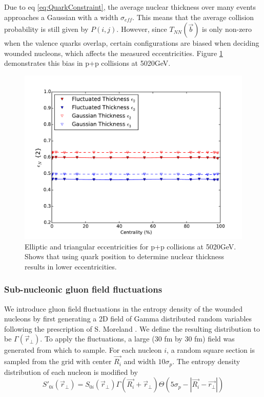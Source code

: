 \documentclass[twocolumn,showpacs,amsfonts,aps,prc,nofootinbib,floatfix]{revtex4}
\begin{document}
Due to eq \ref{eq:QuarkConstraint}, the average nuclear thickness over many events approaches a Gaussian with a width $\sigma_{eff}$. This means that the average collision probability is still given by $P(i,j)$. However, since $T_{NN}(\vec{b})$ is only non-zero when the valence quarks overlap, certain configurations are biased when deciding wounded nucleons, which affects the measured eccentricities. Figure \ref{fig:CollisionComaprison} demonstrates this bias in p+p collisions at 5020GeV.
\begin{figure}
	\includegraphics[width = \linewidth]{figs/CollisionCriterionComparisonTotalEntropy5020GeV.pdf}
	\caption{Elliptic and triangular eccentricities for p+p collisions at 5020GeV. Shows that using quark position to determine nuclear thickness results in lower eccentricities. }
	\label{fig:CollisionComaprison}
\end{figure}


\subsubsection{Sub-nucleonic gluon field fluctuations}
\label{sec2b2}
We introduce gluon field fluctuations in the entropy density of the wounded nucleons by first generating a 2D field of Gamma distributed random variables following the prescription of S. Moreland \cite{Moreland:2012qw}. We define the resulting distribution to be $\Gamma(\vec{r}_\perp)$. To apply the fluctuations, a large (30 fm by 30 fm) field was generated from which to sample. For each nucleon $i$, a random square section is sampled from the grid with center $\vec{R_i}$ and width $10\sigma_p$. The entropy density distribution of each nucleon is modified by 
\begin{equation}
	S'_{0i}(\vec{r}_\perp) = S_{0i}(\vec{r}_\perp) \Gamma(\vec{R_i} + \vec{r}_\perp) \Theta(5\sigma_p - |{\vec{R_i}-\vec{r_\perp}}|)
\end{equation}
\end{document}
